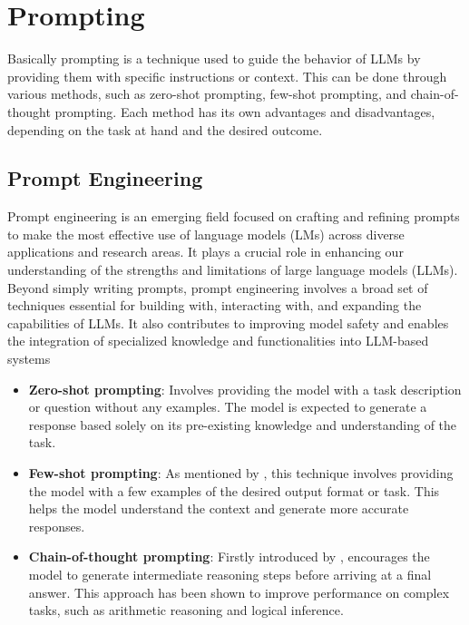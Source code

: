 \section{Prompting}

Basically prompting is a technique used to guide the behavior of LLMs by providing them with specific instructions or context. 
This can be done through various methods, such as zero-shot prompting, few-shot prompting, and chain-of-thought prompting. 
Each method has its own advantages and disadvantages, depending on the task at hand and the desired outcome.


\subsection{Prompt Engineering}

Prompt engineering is an emerging field focused on crafting and refining prompts to make the most effective use of language models (LMs) 
across diverse applications and research areas. It plays a crucial role in enhancing our understanding of the strengths and limitations of large language models (LLMs). 
Beyond simply writing prompts, prompt engineering involves a broad set of techniques essential for building with, interacting with, and expanding the capabilities of LLMs. 
It also contributes to improving model safety and enables the integration of specialized knowledge and functionalities into LLM-based systems


\begin{itemize}
    \item \textbf{Zero-shot prompting}: Involves providing the model with a task description or question without any examples. The model is expected to generate a response based solely on its pre-existing knowledge and understanding of the task.
    \item \textbf{Few-shot prompting}: As mentioned by \cite{fewshot2020}, this technique involves providing the model with a few examples of the desired output format or task. This helps the model understand the context and generate more accurate responses.
    \item \textbf{Chain-of-thought prompting}: Firstly introduced by \cite{chainofthought2023}, encourages the model to generate intermediate reasoning steps before arriving at a final answer. This approach has been shown to improve performance on complex tasks, such as arithmetic reasoning and logical inference.
\end{itemize}











